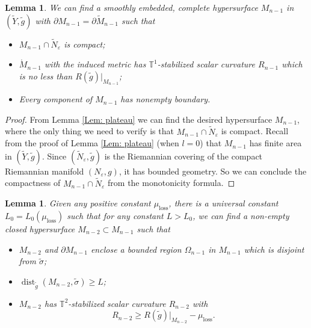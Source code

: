 \documentclass[11pt,letterpaper]{amsart}
\numberwithin{equation}{section}
\newtheorem{lemma}[theorem]{Lemma}
\theoremstyle{definition}
\DeclareMathOperator{\dist}{dist}
\newcommand{\ve}{\varepsilon}
\newcommand{\ti}[1]{\tilde{#1}}
\begin{document}
\begin{lemma}\label{Lem: Mn-1}
We can find a smoothly embedded, complete hypersurface $M_{n-1}$ in $(\tilde Y,\tilde g)$ with $\partial M_{n-1}=\partial\tilde M_{n-1}$ such that
\begin{itemize}\setlength{\itemsep}{1mm}
\item $M_{n-1}\cap \tilde N_\ve$ is compact;
\item $\mathring M_{n-1}$ with the induced metric has $\mathbb T^1$-stabilized scalar curvature $R_{n-1}$ which is no less than $R(\tilde g)|_{M_{n-1}}$;
\item Every component of $M_{n-1}$ has nonempty boundary.
\end{itemize}
\end{lemma}
\begin{proof}
From Lemma \ref{Lem: plateau} we can find the desired hypersurface $M_{n-1}$, where the only thing we need to verify is that $M_{n-1}\cap \tilde N_\ve$ is compact. Recall from the proof of Lemma \ref{Lem: plateau} {(when $l=0$)} that $M_{n-1}$ has finite area {in $(\ti{Y},\ti{g})$}. Since $(\tilde N_\ve,\ti{g})$ is the Riemannian covering of the compact Riemannian manifold $(N_\ve,g)$, it has bounded geometry.  So we can conclude the compactness of $M_{n-1}\cap\tilde N_\ve$ from the monotonicity formula.
\end{proof}

\begin{lemma}\label{Lem: Mn-2}
Given any positive constant $\mu_{\mathrm{loss}}$, there is a universal constant $L_0=L_0(\mu_{\mathrm{loss}})$ such that for any constant $L> L_0$, we can find a non-empty closed hypersurface $M_{n-2}\subset M_{n-1}$ such that
\begin{itemize}\setlength{\itemsep}{1mm}
\item $M_{n-2}$ and $\partial M_{n-1}$ enclose a bounded region $\Omega_{n-1}$ in $M_{n-1}$ which is disjoint from $\tilde\sigma$;
\item
$
\dist_{\tilde g}(M_{n-2},\tilde\sigma)\geq L
$;
\item $M_{n-2}$ has $\mathbb T^2$-stabilized scalar curvature $R_{n-2}$ with
$$R_{n-2}\geq R(\tilde g)|_{M_{n-2}}-\mu_{\mathrm{loss}}.$$
\end{itemize}
\end{lemma}
\end{document}
